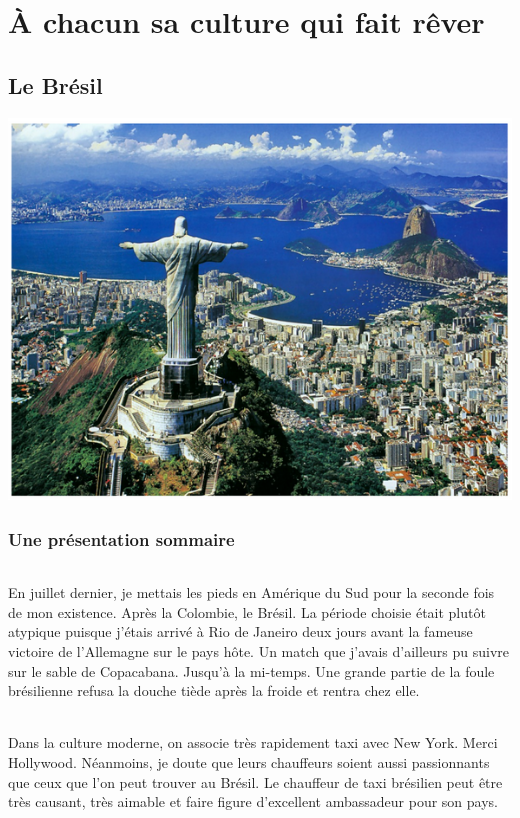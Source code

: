 \part{À chacun sa culture qui fait rêver}
\chapter{Le Brésil}

\begin{center}
\includegraphics[scale=0.5]{bresil1.png}
\end{center}

\section{Une présentation sommaire}

\paragraph{} En juillet dernier, je mettais les pieds en Amérique du Sud pour
la seconde fois de mon existence. Après la Colombie, le Brésil. La période
choisie était plutôt atypique puisque j’étais arrivé à Rio de Janeiro deux
jours avant la fameuse victoire de l’Allemagne sur le pays hôte. Un match que
j’avais d’ailleurs pu suivre sur le sable de Copacabana. Jusqu’à la mi-temps.
Une grande partie de la foule brésilienne refusa la douche tiède après la
froide et rentra chez elle.

\paragraph{} Dans la culture moderne, on associe très rapidement taxi avec New
York. Merci Hollywood. Néanmoins, je doute que leurs chauffeurs soient aussi
passionnants que ceux que l’on peut trouver au Brésil.  Le chauffeur de taxi
brésilien peut être très causant, très aimable et faire figure d’excellent
ambassadeur pour son pays.

